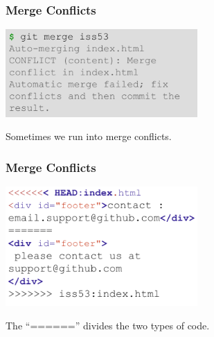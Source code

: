 \begin{frame}
\frametitle{\large Merge Conflicts}
\begin{center}
\includegraphics[width=0.55\textwidth]{img/branching_images/merge1.png}
\end{center}
\vspace{2mm}
\begin{center}
Sometimes we run into merge conflicts.
\end{center}
\end{frame}

\begin{frame}
\frametitle{\large Merge Conflicts}
\begin{center}
\includegraphics[width=0.55\textwidth]{img/branching_images/merge2.png}
\end{center}
\vspace{2mm}
\begin{center}
The ``======'' divides the two types of code.
\end{center}
\end{frame}